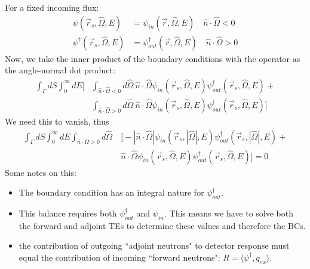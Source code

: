 \documentclass[12pt]{article}
\newcommand{\vOmega}{\ensuremath{\hat{\Omega}}}
\begin{document}
For a fixed incoming flux:
\begin{align*}
\psi(\vec{r}_s, \vOmega, E) &= \psi_{in}(\vec{r}, \vOmega, E) \quad \hat{n} \cdot \vOmega < 0 \\
\psi^{\dagger}(\vec{r}_s, \vOmega, E) &= \psi^{\dagger}_{out}(\vec{r}, \vOmega, E) \quad \hat{n} \cdot \vOmega > 0 
\end{align*}
Now, we take the inner product of the boundary conditions with the operator as the angle-normal dot product:
\begin{align*}
\int_{\Gamma} dS \int_0^{\infty} dE \bigl[&\int_{\hat{n} \cdot \vOmega < 0} d\vOmega \: \hat{n} \cdot \vOmega \psi_{in}(\vec{r}_s, \vOmega, E) \psi_{out}^{\dagger}(\vec{r}_s, \vOmega, E) +\\ 
&\int_{\hat{n} \cdot \vOmega > 0} d\vOmega \: \hat{n} \cdot \vOmega \psi_{in}(\vec{r}_s, \vOmega, E) \psi_{out}^{\dagger}(\vec{r}_s, \vOmega, E) \bigr] 
\end{align*}
We need this to vanish, thus
\begin{align*}
\int_{\Gamma} dS \int_0^{\infty} dE \int_{\hat{n} \cdot \vOmega > 0} d\vOmega \: &\bigl[-|\hat{n} \cdot \vOmega| \psi_{in}(\vec{r}_s, |\vOmega|, E) \psi_{out}^{\dagger}(\vec{r}_s, |\vOmega|, E) +\\
&\hat{n} \cdot \vOmega \psi_{in}(\vec{r}_s, \vOmega, E) \psi_{out}^{\dagger}(\vec{r}_s, \vOmega, E) \bigr] =0
\end{align*}
Some notes on this:
\begin{itemize}
\item The boundary condition  has an integral nature for $\psi_{out}^{\dagger}$.
\item This balance requires both $\psi_{out}^{\dagger}$ and $\psi_{in}$. This means we have to solve both the forward and adjoint TEs to determine these values and therefore the BCs.
\item the contribution of outgoing ``adjoint neutrons" to detector response must equal the contribution of incoming ``forward neutrons": $R = \langle \psi^{\dagger}, q_{ex} \rangle$.
\end{itemize}
\end{document}
